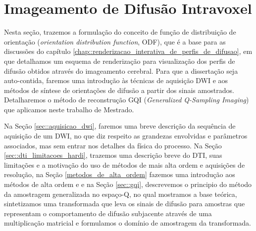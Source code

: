 \documentclass[
    12pt,                %
    oneside,            %
    a4paper,            %
    english,            %
    french,                %
    spanish,            %
    brazil                %
    ]{abntex2}
\begin{document}




\chapter{Imageamento de Difusão Intravoxel}
\label{chapter::metodos_hardi}

Nesta seção, trazemos a formulação do conceito de função de distribuição de orientação (\textit{orientation distribution function}, ODF), que é a base para as discussões do capítulo \ref{chap::renderizacao_interativa_de_perfis_de_difusao}, em que detalhamos um esquema de renderização para visualização dos perfis de difusão obtidos através do imageamento cerebral. Para que a dissertação seja auto-contida, faremos uma introdução às técnicas de aquisição DWI e aos métodos de síntese de orientações de difusão a partir dos sinais amostrados. Detalharemos o método de reconstrução GQI (\textit{Generalized Q-Sampling Imaging}) que aplicamos neste trabalho de Mestrado.

Na Seção \ref{sec::aquisicao_dwi}, faremos uma breve descrição da sequência de aquisição de um DWI, no que diz respeito as grandezas envolvidas e parâmetros associados, mas sem entrar nos detalhes da física do processo. Na Seção \ref{sec::dti_limitacoes_hardi}, trazemos uma descrição breve do DTI, suas limitações e a motivação do uso de métodos de mais alta ordem e aquisições de resolução, na Seção \ref{metodos_de_alta_ordem} fazemos uma introdução aos métodos de alta ordem e  e na Seção \ref{sec::gqi}, descrevemos o principio do método da amostragem generalizada no espaço-Q, no qual mostramos a base teórica, sintetizamos uma transformada que leva os sinais de difusão para amostras que representam o comportamento de difusão subjacente através de uma multiplicação matricial e formulamos o domínio de amostragem da transformada. %
\end{document}
